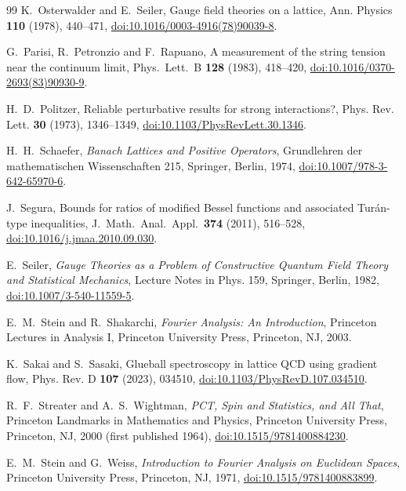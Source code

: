 \begin{thebibliography}{99}
K.~Osterwalder and E.~Seiler, Gauge field theories on a lattice, Ann. Physics
\textbf{110} (1978), 440--471,
\href{https://doi.org/10.1016/0003-4916(78)90039-8}{doi:10.1016/0003-4916(78)90039-8}.

G.~Parisi, R.~Petronzio and F.~Rapuano, A measurement of the string tension near the continuum limit, Phys.\ Lett.\ B \textbf{128} (1983), 418--420, \href{https://doi.org/10.1016/0370-2693(83)90930-9}{doi:10.1016/0370-2693(83)90930-9}.

H.~D.~Politzer, Reliable perturbative results for strong interactions?, Phys. Rev. Lett. \textbf{30} (1973), 1346--1349, \href{https://doi.org/10.1103/PhysRevLett.30.1346}{doi:10.1103/PhysRevLett.30.1346}.

H.~H.~Schaefer, \emph{Banach Lattices and Positive Operators}, Grundlehren
der mathematischen Wissenschaften 215, Springer, Berlin, 1974,
\href{https://doi.org/10.1007/978-3-642-65970-6}{doi:10.1007/978-3-642-65970-6}.

J.~Segura, Bounds for ratios of modified Bessel functions and associated Tur\'an-type inequalities, J.\ Math.\ Anal.\ Appl.\ \textbf{374} (2011), 516--528, \href{https://doi.org/10.1016/j.jmaa.2010.09.030}{doi:10.1016/j.jmaa.2010.09.030}.

E.~Seiler, \emph{Gauge Theories as a Problem of Constructive Quantum Field
Theory and Statistical Mechanics}, Lecture Notes in Phys. 159, Springer,
Berlin, 1982, \href{https://doi.org/10.1007/3-540-11559-5}{doi:10.1007/3-540-11559-5}.

E.~M.~Stein and R.~Shakarchi, \emph{Fourier Analysis: An Introduction}, Princeton Lectures in Analysis I, Princeton University Press, Princeton, NJ, 2003.

K.~Sakai and S.~Sasaki, Glueball spectroscopy in lattice QCD using gradient
flow, Phys. Rev. D \textbf{107} (2023), 034510,
\href{https://doi.org/10.1103/PhysRevD.107.034510}{doi:10.1103/PhysRevD.107.034510}.

R.~F.~Streater and A.~S.~Wightman, \emph{PCT, Spin and Statistics, and All
That}, Princeton Landmarks in Mathematics and Physics, Princeton University
Press, Princeton, NJ, 2000 (first published 1964),
\href{https://doi.org/10.1515/9781400884230}{doi:10.1515/9781400884230}.

E.~M.~Stein and G.~Weiss, \emph{Introduction to Fourier Analysis on Euclidean Spaces}, Princeton University Press, Princeton, NJ, 1971, \href{https://doi.org/10.1515/9781400883899}{doi:10.1515/9781400883899}.


\end{thebibliography}
